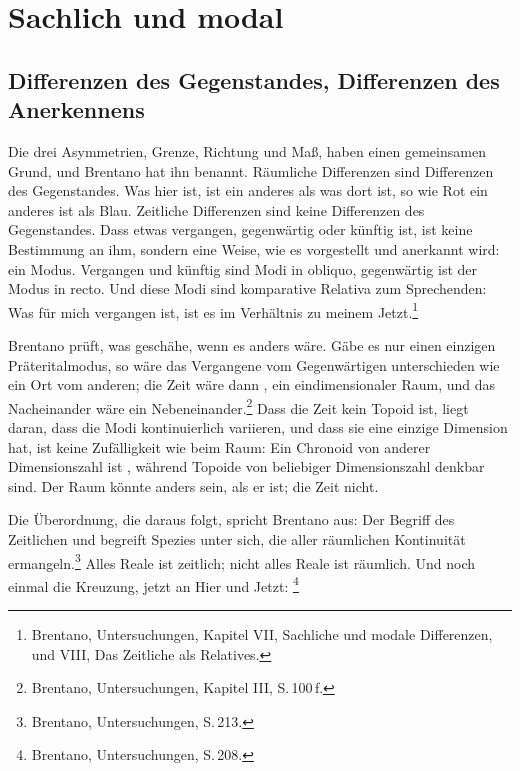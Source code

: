 \chapter{Sachlich und modal}

\section{Differenzen des Gegenstandes, Differenzen des Anerkennens}

Die drei Asymmetrien, Grenze, Richtung und Maß, haben einen gemeinsamen Grund, und Brentano hat ihn benannt. Räumliche Differenzen sind Differenzen des Gegenstandes. Was hier ist, ist ein anderes als was dort ist, so wie Rot ein anderes ist als Blau. Zeitliche Differenzen sind keine Differenzen des Gegenstandes. Dass etwas vergangen, gegenwärtig oder künftig ist, ist keine Bestimmung an ihm, sondern eine Weise, wie es vorgestellt und anerkannt wird: ein Modus. Vergangen und künftig sind Modi in obliquo, gegenwärtig ist der Modus in recto. Und diese Modi sind komparative Relativa zum Sprechenden: Was für mich vergangen ist, ist es im Verhältnis zu meinem Jetzt.\footnote{Brentano, Untersuchungen, Kapitel VII, Sachliche und modale Differenzen, und VIII, Das Zeitliche als Relatives.}

Brentano prüft, was geschähe, wenn es anders wäre. Gäbe es nur einen einzigen Präteritalmodus, so wäre das Vergangene vom Gegenwärtigen unterschieden wie ein Ort vom anderen; die Zeit wäre dann , ein eindimensionaler Raum, und das Nacheinander wäre ein Nebeneinander.\footnote{Brentano, Untersuchungen, Kapitel III, S.\,100\,f.} Dass die Zeit kein Topoid ist, liegt daran, dass die Modi kontinuierlich variieren, und dass sie eine einzige Dimension hat, ist keine Zufälligkeit wie beim Raum: Ein Chronoid von anderer Dimensionszahl ist , während Topoide von beliebiger Dimensionszahl denkbar sind. Der Raum könnte anders sein, als er ist; die Zeit nicht.

Die Überordnung, die daraus folgt, spricht Brentano aus: Der Begriff des Zeitlichen  und begreift Spezies unter sich, die aller räumlichen Kontinuität ermangeln.\footnote{Brentano, Untersuchungen, S.\,213.} Alles Reale ist zeitlich; nicht alles Reale ist räumlich. Und noch einmal die Kreuzung, jetzt an Hier und Jetzt: \footnote{Brentano, Untersuchungen, S.\,208.}


